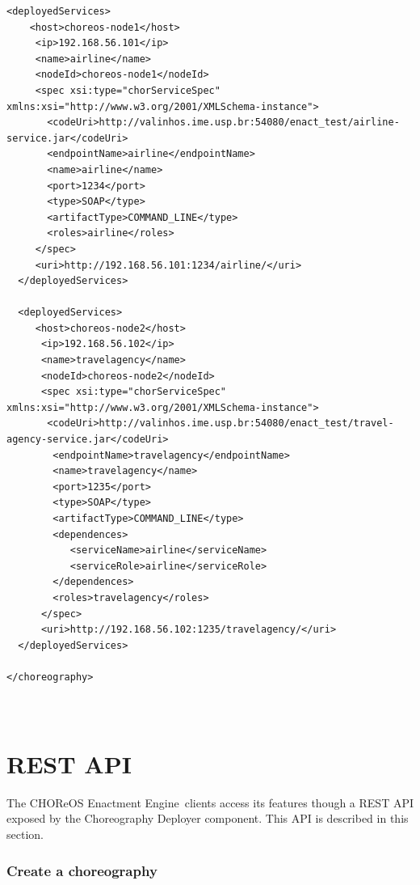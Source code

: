 \documentclass[a4paper, 10pt]{article}
\newcommand{\ee}{CHOReOS Enactment Engine}
\begin{document}
{\begin{lstlisting}[caption=Choreography XML representation example, label=lst:chor_xml]
  <deployedServices>
    <host>choreos-node1</host>
     <ip>192.168.56.101</ip>
     <name>airline</name>
     <nodeId>choreos-node1</nodeId>
     <spec xsi:type="chorServiceSpec" xmlns:xsi="http://www.w3.org/2001/XMLSchema-instance">
       <codeUri>http://valinhos.ime.usp.br:54080/enact_test/airline-service.jar</codeUri>
       <endpointName>airline</endpointName>
       <name>airline</name>
       <port>1234</port>
       <type>SOAP</type>
       <artifactType>COMMAND_LINE</type>
       <roles>airline</roles>
     </spec>
     <uri>http://192.168.56.101:1234/airline/</uri>
  </deployedServices>
  
  <deployedServices>
     <host>choreos-node2</host>
      <ip>192.168.56.102</ip>
      <name>travelagency</name>
      <nodeId>choreos-node2</nodeId>
      <spec xsi:type="chorServiceSpec" xmlns:xsi="http://www.w3.org/2001/XMLSchema-instance">
       <codeUri>http://valinhos.ime.usp.br:54080/enact_test/travel-agency-service.jar</codeUri>
        <endpointName>travelagency</endpointName>
        <name>travelagency</name>
        <port>1235</port>
        <type>SOAP</type>
        <artifactType>COMMAND_LINE</type>
        <dependences>
           <serviceName>airline</serviceName>
           <serviceRole>airline</serviceRole>
        </dependences>
        <roles>travelagency</roles>
      </spec>
      <uri>http://192.168.56.102:1235/travelagency/</uri>
  </deployedServices>

</choreography>



\end{lstlisting}

}

\section{REST API}
\label{sec:api}

The \ee\ clients access its features though a REST API exposed by the Choreography Deployer component. This API is described in this section.

\subsubsection*{Create a choreography}
\end{document}
